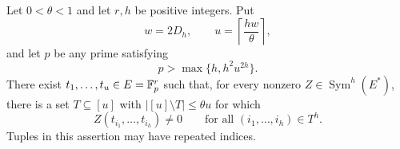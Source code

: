 \begin{proposition}
\label{prop:robust-directions}
Let $0<\theta<1$ and let $r,h$ be positive integers.  Put
\begin{equation}
  w=2D_h,\qquad
  u=\left\lceil\frac{hw}{\theta}\right\rceil,
  \label{eq:field-parameters}
\end{equation}
and let $p$ be any prime satisfying
\begin{equation}
  p>\max\{h,h^2u^{2h}\}.
  \label{eq:field-prime-threshold}
\end{equation}
There exist $t_1,\ldots,t_u\in E=\mathbb F_p^r$ such that, for every nonzero
$Z\in\operatorname{Sym}^h(E^*)$, there is a set $T\subseteq[u]$ with
$|[u]\setminus T|\le\theta u$ for which
\begin{equation}
  Z(t_{i_1},\ldots,t_{i_h})\ne0
  \qquad\text{for all }(i_1,\ldots,i_h)\in T^h.
  \label{eq:robust-nonvanishing}
\end{equation}
Tuples in this assertion may have repeated indices.
\end{proposition}

